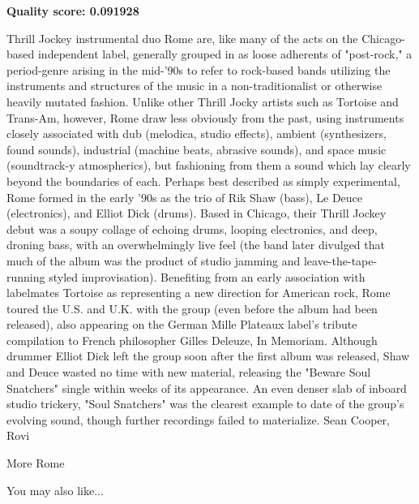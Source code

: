 \documentclass[conference]{IEEEtran}
\begin{document}
\textbf{Quality score: 0.091928}
\begin{textbox}
Thrill Jockey instrumental duo Rome are, like many of the acts on the Chicago-based independent label, generally grouped in as loose adherents of "post-rock," a period-genre arising in the mid-'90s to refer to rock-based bands utilizing the instruments and structures of the music in a non-traditionalist or otherwise heavily mutated fashion. Unlike other Thrill Jocky artists such as Tortoise and Trans-Am, however, Rome draw less obviously from the past, using instruments closely associated with dub (melodica, studio effects), ambient (synthesizers, found sounds), industrial (machine beats, abrasive sounds), and space music (soundtrack-y atmospherics), but fashioning from them a sound which lay clearly beyond the boundaries of each. Perhaps best described as simply experimental, Rome formed in the early '90s as the trio of Rik Shaw (bass), Le Deuce (electronics), and Elliot Dick (drums). Based in Chicago, their Thrill Jockey debut was a soupy collage of echoing drums, looping electronics, and deep, droning bass, with an overwhelmingly live feel (the band later divulged that much of the album was the product of studio jamming and leave-the-tape-running styled improvisation). Benefiting from an early association with labelmates Tortoise as representing a new direction for American rock, Rome toured the U.S. and U.K. with the group (even before the album had been released), also appearing on the German Mille Plateaux label's tribute compilation to French philosopher Gilles Deleuze, In Memoriam. Although drummer Elliot Dick left the group soon after the first album was released, Shaw and Deuce wasted no time with new material, releasing the "Beware Soul Snatchers" single within weeks of its appearance. An even denser slab of inboard studio trickery, "Soul Snatchers" was the clearest example to date of the group's evolving sound, though further recordings failed to materialize.
Sean Cooper, Rovi

More Rome


You may also like...
\end{textbox}
\end{document}
